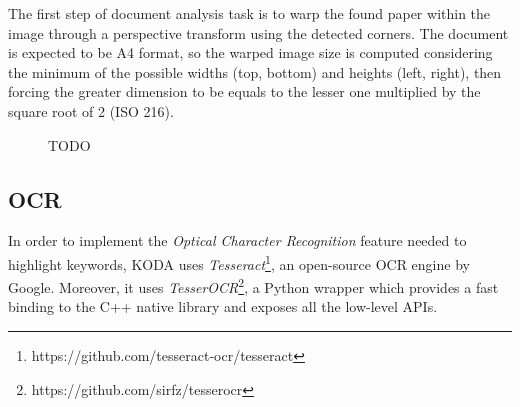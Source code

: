 \documentclass[a4paper]{article}
\begin{document}
The first step of document analysis task is to warp the found paper within the image through a perspective transform using the detected corners. The document is expected to be A4 format, so the warped image size is computed considering the minimum of the possible widths (top, bottom) and heights (left, right), then forcing the greater dimension to be equals to the lesser one multiplied by the square root of 2 (ISO 216).

\begin{figure}[H]
	\caption{TODO}
	\label{fig:warping}
\end{figure}

\subsection{OCR}

In order to implement the \textit{Optical Character Recognition} feature needed to highlight keywords, KODA uses \textit{Tesseract}\footnote{https://github.com/tesseract-ocr/tesseract}, an open-source OCR engine by Google. Moreover, it uses \textit{TesserOCR}\footnote{https://github.com/sirfz/tesserocr}, a Python wrapper which provides a fast binding to the C++ native library and exposes all the low-level APIs.
\end{document}
